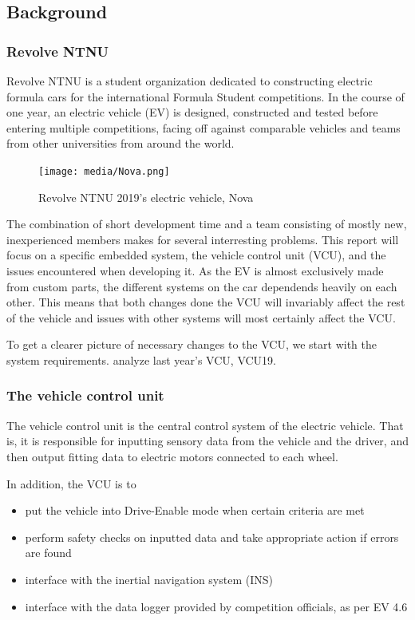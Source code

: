 \subsection{Background}

\subsubsection{Revolve NTNU}

Revolve NTNU is a student organization dedicated to constructing electric formula cars for the international Formula Student competitions. In the course of one year, an electric vehicle (EV) is designed, constructed and tested before entering multiple competitions, facing off against comparable vehicles and teams from other universities from around the world.

\begin{figure}[H]
    \centering
    \texttt{[image: media/Nova.png]}
    \caption{Revolve NTNU 2019's electric vehicle, Nova}
    \label{fig:nova}
\end{figure}

The combination of short development time and a team consisting of mostly new, inexperienced members makes for several interresting problems. This report will focus on a specific embedded system, the vehicle control unit (VCU), and the issues encountered when developing it. As the EV is almost exclusively made from custom parts, the different systems on the car dependends heavily on each other. This means that both changes done the VCU will invariably affect the rest of the vehicle and issues with other systems will most certainly affect the VCU. 

To get a clearer picture of necessary changes to the VCU, we start with the system requirements. analyze last year's VCU, VCU19.

\subsubsection{The vehicle control unit}

The vehicle control unit is the central control system of the electric vehicle. That is, it is responsible for inputting sensory data from the vehicle and the driver, and then output fitting data to electric motors connected to each wheel.

In addition, the VCU is to
\begin{itemize}
    \item put the vehicle into Drive-Enable mode when certain criteria are met
    \item perform safety checks on inputted data and take appropriate action if errors are found
    \item interface with the inertial navigation system (INS)
    \item interface with the data logger provided by competition officials, as per EV 4.6 \cite{fsgrules}
\end{itemize}

